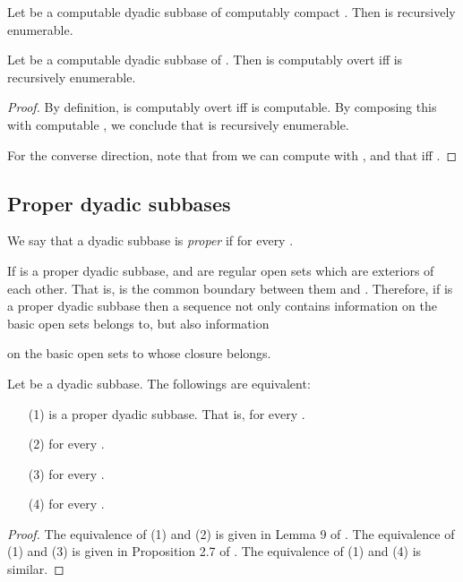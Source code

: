 \documentclass{eptcs-modified}
\begin{document}
\begin{corollary}
\label{corr:compactsemicharac}
Let  be a computable dyadic subbase of computably compact . Then  is recursively enumerable.
\end{corollary}


\begin{proposition}
\label{prop:overtcharac}
Let  be a computable dyadic subbase of . Then  is computably overt iff  is recursively enumerable.
\begin{proof}
By definition,  is computably overt iff  is computable. By composing this with computable , we conclude that  is recursively enumerable.

For the converse direction, note that from  we can compute  with , and that  iff .
\end{proof}
\end{proposition}


\subsection{Proper dyadic subbases}

\begin{definition}
We say that a dyadic subbase  is {\em proper} if
 for every .
\end{definition}

If  is a proper dyadic subbase,
 and   are regular open sets which are exteriors of each other.  That is,  is the common boundary between them and
.
Therefore, if  is a proper dyadic subbase then
a sequence 
not only contains information
 on
the basic open sets  belongs to, but also information

on the basic open sets to whose closure  belongs.

\begin{proposition}
\label{prop:propercharac}
Let  be a dyadic subbase.   The followings are equivalent:
\begin{itemize}
\item[(1)]  is a proper dyadic subbase.  That is,  for every .
\item[(2)]  for every .
\item[(3)] 
for every .
\item[(4)] 
for every .
\end{itemize}
\begin{proof} The equivalence of (1) and (2) is given in Lemma 9 of \cite{tsuiki2}.
The equivalence of (1) and (3) is given in Proposition 2.7 of \cite{tsuiki3}.
The equivalence of (1) and (4) is similar.
\end{proof}
\end{proposition}
\end{document}
